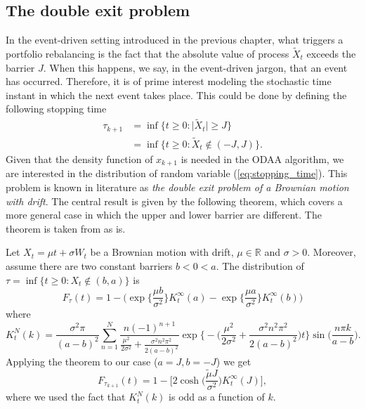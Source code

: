 \subsection{The double exit problem }
In the event-driven setting introduced in the previous chapter, what triggers a portfolio rebalancing is the fact that the absolute value of process $\widetilde{X}_t$ exceeds the barrier $J$. When this happens, we say, in the event-driven jargon, that an event has occurred. Therefore, it is of prime interest  modeling the stochastic time instant in which the next event takes place. This could be done by defining the following stopping time
\begin{align}\label{eq:stopping_time}
\tau_{k+1} & = \inf\big\{t\geq 0 \colon \lvert\widetilde{X}_t\lvert\geq J \big\}\\\nonumber
& = \inf\big\{t\geq 0 \colon \widetilde{X}_t \notin (-J,J) \big\}.
\end{align}
Given that the density function of $x_{k+1}$ is needed in the \gls{ODAA} algorithm, we are interested in the distribution of random variable (\ref{eq:stopping_time}). This problem is known in literature as \textit{the double exit problem of a Brownian motion with drift}. The central result is given by the following theorem, which covers a more general case in which the upper and lower barrier are different. The theorem is taken from \cite{Hieber2012} as is.
\begin{theorem}\label{thm:double_exit_problem}
	Let $X_t = \mu t + \sigma W_t$ be a Brownian motion with drift, $\mu \in \mathbb{R}$ and $\sigma > 0$. Moreover, assume there are two constant barriers $b<0<a$. The distribution of $\tau = \inf\big\{t\geq 0 \colon X_t \notin (b,a) \big\}$ is 
	\[
	F_{\tau}(t) = 1-\bigg(\exp\Big\{\frac{\mu b}{\sigma^2}\Big\}K_t^{\infty}(a)-\exp\Big\{\frac{\mu a}{\sigma^2}\Big\}K_t^{\infty}(b) \bigg)
	\]
	where
	\[
	K_t^N(k)= \frac{\sigma^2\pi}{(a-b)^2}\sum_{n=1}^{N}\frac{n(-1)^{n+1}}{\frac{\mu^2}{2\sigma^2}+\frac{\sigma^2n^2\pi^2}{2(a-b)^2}}\exp\bigg\{-\bigg(\frac{\mu^2}{2\sigma^2}+\frac{\sigma^2n^2\pi^2}{2(a-b)^2}\bigg)t\bigg\}\sin\Big(\frac{n\pi k}{a-b}\Big).
	\]
	Applying the theorem to our case ($a=J, b=-J$) we get 
	\begin{equation}
	F_{\tau_{k+1}}(t)=1-\bigg[2\cosh\Big(\frac{\widetilde{\mu}J}{\sigma^2}\Big)K_t^{\infty}(J)\bigg],
	\end{equation}
	where we used the fact that $K_t^N(k)$ is odd as a function of $k$.
\end{theorem}

